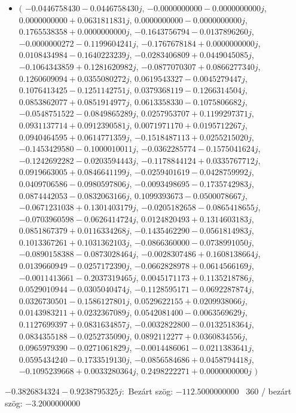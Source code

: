 \documentclass[14pt,a4paper]{article}
\begin{document}
\begin{itemize}
\item
$\big($
$-0.0446758430-0.0446758430j$, $-0.0000000000-0.0000000000j$, $0.0000000000+0.0631811831j$, $0.0000000000-0.0000000000j$, $0.1765538358+0.0000000000j$, $-0.1643756794-0.0137896260j$, $-0.0000000272-0.1199604241j$, $-0.1767678184+0.0000000000j$, $0.0108434984-0.1640223239j$, $-0.0283406809+0.0449045085j$, $-0.1064343859+0.1281620982j$, $-0.0877070307+0.0866277340j$, $0.1260609094+0.0355080272j$, $0.0619543327-0.0045279447j$, $0.1076413425-0.1251142751j$, $0.0379368119-0.1266314504j$, $0.0853862077+0.0851914977j$, $0.0613358330-0.1075806682j$, $-0.0548751522-0.0849865289j$, $0.0257953707+0.1199297371j$, $0.0931137714+0.0912390581j$, $0.0071971170+0.0195712267j$, $0.0940464595+0.0614771359j$, $-0.1518487113+0.0255215020j$, $-0.1453429580-0.1000010011j$, $-0.0362285774-0.1575041624j$, $-0.1242692282-0.0203594443j$, $-0.1178844124+0.0335767712j$, $0.0919663005+0.0846641199j$, $-0.0259401619-0.0428759992j$, $0.0409706586-0.0980597806j$, $-0.0093498695-0.1735742983j$, $0.0874442053-0.0832063166j$, $0.1099393673-0.0500078667j$, $-0.0671231038+0.1301403179j$, $-0.0205182658-0.0865418655j$, $-0.0703960598-0.0626414724j$, $0.0124820493+0.1314603183j$, $0.0851867379+0.0116334268j$, $-0.1435462290-0.0561814983j$, $0.1013367261+0.1031362103j$, $-0.0866360000-0.0738991050j$, $-0.0890158388-0.0873028464j$, $-0.0028307486+0.1608138664j$, $0.0139660949-0.0257172390j$, $-0.0662828978+0.0614566169j$, $-0.0011413661-0.2037319465j$, $0.0045171173+0.1135218786j$, $0.0529010944-0.0305040474j$, $-0.1128595171-0.0692287874j$, $0.0326730501-0.1586127801j$, $0.0529622155+0.0209938066j$, $0.0143983211+0.0232367089j$, $0.0542081400-0.0063569629j$, $0.1127699397+0.0831634857j$, $-0.0032822800-0.0132518364j$, $0.0834355188-0.0252735090j$, $0.0892112277+0.0360834556j$, $0.0965979390-0.0271061829j$, $-0.0014486061-0.0211383641j$, $0.0595434240-0.1733519130j$, $-0.0856584686+0.0458794418j$, $-0.1095239668+0.0033280364j$, $0.2498222271+0.0000000000j$
$\big)$
\end{itemize}
$-0.3826834324-0.9238795325j$:\
Bezárt szög: $-112.5000000000$ \
360 / bezárt szög: $-3.2000000000$\
\end{document}
